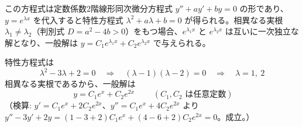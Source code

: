 
この方程式は定数係数2階線形同次微分方程式 $y'' + ay' + by = 0$ の形であり、$y = e^{\lambda x}$ を代入すると特性方程式 $\lambda^{2} + a\lambda + b = 0$ が得られる。相異なる実根 $\lambda_{1} \neq \lambda_{2}$（判別式 $D = a^{2}-4b > 0$）をもつ場合、$e^{\lambda_{1}x}$ と $e^{\lambda_{2}x}$ は互いに一次独立な解となり、一般解は $y = C_{1}e^{\lambda_{1}x} + C_{2}e^{\lambda_{2}x}$ で与えられる。

特性方程式は
\[
\lambda^{2} - 3\lambda + 2 = 0 \quad\Longrightarrow\quad (\lambda-1)(\lambda-2) = 0
\quad\Longrightarrow\quad \lambda = 1,\ 2
\]
相異なる実根であるから、一般解は
\[
\boxed{\; y = C_{1}e^{x} + C_{2}e^{2x} \;}
\qquad (C_{1}, C_{2} \text{ は任意定数})
\]
（検算: $y' = C_{1}e^{x}+2C_{2}e^{2x}$、$y'' = C_{1}e^{x}+4C_{2}e^{2x}$ より
$y''-3y'+2y = (1-3+2)C_{1}e^{x} + (4-6+2)C_{2}e^{2x} = 0$。成立。）

